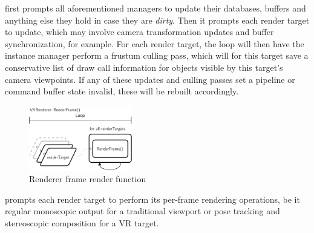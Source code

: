  first prompts all aforementioned managers to update their databases, buffers and anything else they hold in case they are \textit{dirty}. Then it prompts each render target to update, which may involve camera transformation updates and buffer synchronization, for example. For each render target, the loop will then have the instance manager perform a frustum culling pass, which will for this target save a conservative list of draw call information for objects visible by this target's camera viewpoints. 
If any of these updates and culling passes set a pipeline or command buffer state invalid, these will be rebuilt accordingly.  

\begin{figure}[htb]
  \centering
  \includegraphics[width=0.4\textwidth]{pictures/Tachyon_VKRenderer_RenderFrame}
  \caption[VKRenderer's RenderFrame()]{Renderer frame render function}\label{fig:lst_VKRenderer_RenderFrame}
\end{figure} 

 prompts each render target to perform its per-frame rendering operations, be it regular monoscopic output for a traditional viewport or pose tracking and stereoscopic composition for a \gls{VR} target. 

